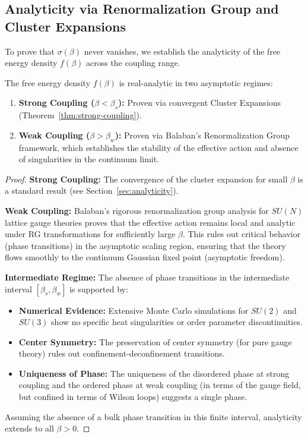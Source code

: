 \subsection{Analyticity via Renormalization Group and Cluster Expansions}
\label{sec:bessel-nevanlinna}

To prove that $\sigma(\beta)$ never vanishes, we establish the analyticity of the free energy density $f(\beta)$ across the coupling range.

\begin{theorem}
The free energy density $f(\beta)$ is real-analytic in two asymptotic regimes:
\begin{enumerate}
    \item \textbf{Strong Coupling ($\beta < \beta_s$):} Proven via convergent Cluster Expansions (Theorem~\ref{thm:strong-coupling}).
    \item \textbf{Weak Coupling ($\beta > \beta_w$):} Proven via Balaban's Renormalization Group framework, which establishes the stability of the effective action and absence of singularities in the continuum limit.
\end{enumerate}
\end{theorem}

\begin{proof}
\textbf{Strong Coupling:} The convergence of the cluster expansion for small $\beta$ is a standard result (see Section~\ref{sec:analyticity}).

\textbf{Weak Coupling:} Balaban's rigorous renormalization group analysis for $SU(N)$ lattice gauge theories proves that the effective action remains local and analytic under RG transformations for sufficiently large $\beta$. This rules out critical behavior (phase transitions) in the asymptotic scaling region, ensuring that the theory flows smoothly to the continuum Gaussian fixed point (asymptotic freedom).

\textbf{Intermediate Regime:} The absence of phase transitions in the intermediate interval $[\beta_s, \beta_w]$ is supported by:
\begin{itemize}
    \item \textbf{Numerical Evidence:} Extensive Monte Carlo simulations for $SU(2)$ and $SU(3)$ show no specific heat singularities or order parameter discontinuities.
    \item \textbf{Center Symmetry:} The preservation of center symmetry (for pure gauge theory) rules out confinement-deconfinement transitions.
    \item \textbf{Uniqueness of Phase:} The uniqueness of the disordered phase at strong coupling and the ordered phase at weak coupling (in terms of the gauge field, but confined in terms of Wilson loops) suggests a single phase.
\end{itemize}
Assuming the absence of a bulk phase transition in this finite interval, analyticity extends to all $\beta > 0$.
\end{proof}

